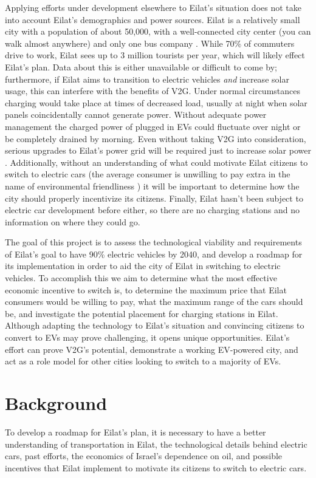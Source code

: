 \documentclass[12pt]{article}                         %
\begin{document}
Applying efforts under development elsewhere to Eilat's situation does not take into account Eilat's demographics and power sources. Eilat is a relatively small city with a population of about 50,000, with a well-connected city center (you can walk almost anywhere) and only one bus company \cite{TransportationEilat}. While 70\% of commuters drive to work, Eilat sees up to 3 million tourists per year, which will likely effect Eilat's plan. Data about this is either unavailable or difficult to come by; furthermore, if Eilat aims to transition to electric vehicles \textit{and} increase solar usage, this can interfere with the benefits of V2G. Under normal circumstances charging would take place at times of decreased load, usually at night when solar panels coincidentally cannot generate power. Without adequate power management the charged power of plugged in EVs could fluctuate over night or be completely drained by morning. Even without taking V2G into consideration, serious upgrades to Eilat's power grid will be required just to increase solar power \cite{Vardimon2011AssessmentIsrael}. Additionally, without an understanding of what could motivate Eilat citizens to switch to electric cars (the average consumer is unwilling to pay extra in the name of environmental friendliness \cite{Mock2010MarketVehicles}) it will be important to determine how the city should properly incentivize its citizens. Finally, Eilat hasn't been subject to electric car development before either, so there are no charging stations and no information on where they could go.

The goal of this project is to assess the technological viability and requirements of Eilat's goal to have 90\% electric vehicles by 2040, and develop a roadmap for its implementation in order to aid the city of Eilat in switching to electric vehicles. To accomplish this we aim to determine what the most effective economic incentive to switch is, to determine the maximum price that Eilat consumers would be willing to pay, what the maximum range of the cars should be, and investigate the potential placement for charging stations in Eilat. Although adapting the technology to Eilat's situation and convincing citizens to convert to EVs may prove challenging, it opens unique opportunities. Eilat's effort can prove V2G's potential, demonstrate a working EV-powered city, and act as a role model for other cities looking to switch to a majority of EVs.

\newpage
\section{Background}
To develop a roadmap for Eilat's plan, it is necessary to have a better understanding of transportation in Eilat, the technological details behind electric cars, past efforts, the economics of Israel's dependence on oil, and possible incentives that Eilat implement to motivate its citizens to switch to electric cars.
\end{document}
